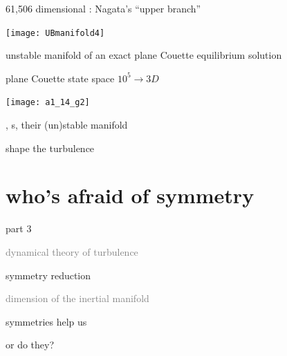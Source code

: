 \begin{frame}{61,506 dimensional : Nagata's ``upper branch''}
\begin{center}
\texttt{[image: UBmanifold4]}
\end{center}
unstable manifold of an exact plane Couette equilibrium solution
\end{frame}

\begin{frame}{plane Couette state space $10^5 \to 3D$}
\begin{center}
\texttt{[image: a1\_14\_g2]}
\end{center}
\eqva, \po s, their (un)stable manifold

\hfill   shape the turbulence
\end{frame}


\section[who's afraid of symmetry]{who's afraid of symmetry}

\begin{frame}{part 3}
\begin{enumerate}
              \item
    \textcolor{gray}{\small
dynamical theory of turbulence
              \item
\statesp
        }
              \item
    {\Large
symmetry reduction
    }\textcolor{gray}{\small
              \item
dimension of the inertial manifold
                    }
            \end{enumerate}
\end{frame}


\begin{frame}{}
\begin{block}{}
{\Huge
symmetries help us
}
\end{block}
or do they?

\vfill
%
%
%
\end{frame}


